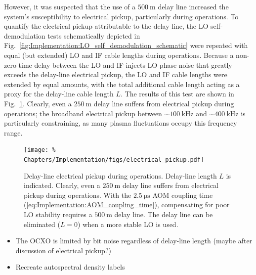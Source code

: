 However, it was suspected that the use of a $\SI{500}{\meter}$ delay line
increased the system's susceptibility to electrical pickup,
particularly during \diiid\space operations.
To quantify the electrical pickup attributable to the delay line,
the LO self-demodulation tests schematically depicted in
Fig.~\ref{fig:Implementation:LO_self_demodulation_schematic}
were repeated with equal (but extended) LO and IF cable lengths
during \diiid\space operations.
Because a non-zero time delay between the LO and IF
injects LO phase noise that greatly exceeds
the delay-line electrical pickup,
the LO and IF cable lengths were extended by equal amounts,
with the total additional cable length
acting as a proxy for the delay-line cable length $L$.
The results of this test are shown in
Fig.~\ref{fig:Implementation:electrical_pickup}.
Clearly, even a $\SI{250}{\meter}$ delay line
suffers from electrical pickup during \diiid\space operations;
the broadband electrical pickup between
$\sim \SI{100}{\kilo\hertz}$ and $\sim \SI{400}{\kilo\hertz}$
is particularly constraining,
as many plasma fluctuations occupy this frequency range.

\begin{figure}
  \centering
  \texttt{[image: \%
    Chapters/Implementation/figs/electrical\_pickup.pdf]}
  \caption[Delay-line electrical pickup during \diiid\space operations]{%
    Delay-line electrical pickup during \diiid\space operations.
    Delay-line length $L$ is indicated.
    Clearly, even a $\SI{250}{\meter}$ delay line
    suffers from electrical pickup during \diiid\space operations.
    With the $\SI{2.5}{\micro\second}$ AOM coupling time
    (\ref{eq:Implementation:AOM_coupling_time}),
    compensating for poor LO stability
    requires a $\SI{500}{\meter}$ delay line.
    The delay line can be eliminated ($L = 0$)
    when a more stable LO is used.
  }
  \label{fig:Implementation:electrical_pickup}
\end{figure}

\begin{itemize}
  \item The OCXO is limited by bit noise regardless of delay-line length
    (maybe after discussion of electrical pickup?)
  \item Recreate autospectral density labels
\end{itemize}


